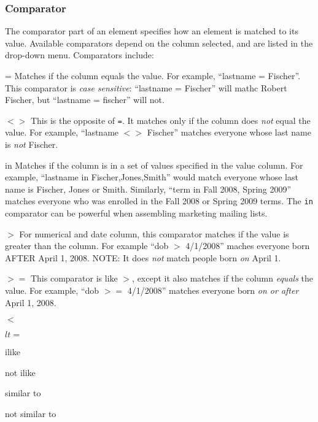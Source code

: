 \documentclass[11pt]{article}
\begin{document}
\subsubsection{Comparator}

The comparator part of an element specifies how an element is matched to its value.  Available comparators depend on the column selected, and are listed in the drop-down menu.  Comparators include:

\begin{description}

\item{=} Matches if the column equals the value.  For example, ``lastname = Fischer''.  This comparator is \emph{case sensitive}: ``lastname = Fischer'' will mathc Robert Fischer, but ``lastname = fischer'' will not.

\item{$\lt\gt$} This is the opposite of {\tt =}.  It matches only if the column does \emph{not} equal the value.  For example, ``lastname $\lt\gt$ Fischer'' matches everyone whose last name is \emph{not} Fischer.

\item{in} Matches if the column is in a set of values specified in the value column.  For example, ``lastname in Fischer,Jones,Smith'' would match everyone whose last name is Fischer, Jones or Smith.  Similarly, ``term in Fall 2008, Spring 2009'' matches everyone who was enrolled in the Fall 2008 or Spring 2009 terms.  The {\tt in} comparator can be powerful when assembling marketing mailing lists.

\item{$\gt$} For numerical and date column, this comparator matches if the value is greater than the column.  For example ``dob $\gt$ 4/1/2008'' maches everyone born AFTER April 1, 2008.  NOTE: It does \emph{not} match people born \emph{on} April 1.

\item{$\gt=$} This comparator is like $\gt$, except it also matches if the column \emph{equals} the value.  For example, ``dob $\gt=$ 4/1/2008'' matches everyone born \emph{on or after} April 1, 2008.

\item{$\lt$}

\item{$lt=$}

\item{ilike}

\item{not ilike}

\item{similar to}
\item{not similar to}

\end{description}
\end{document}
